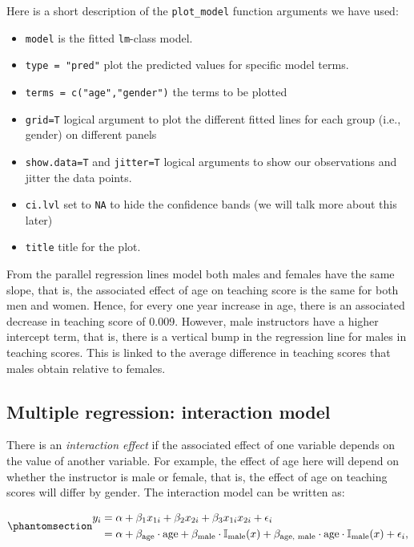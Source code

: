 \documentclass[
  letterpaper,
  DIV=11,
  numbers=noendperiod]{scrartcl}
\begin{document}
Here is a short description of the \texttt{plot\_model} function
arguments we have used:

\begin{itemize}
\item
  \texttt{model} is the fitted \texttt{lm}-class model.
\item
  \texttt{type\ =\ "pred"} plot the predicted values for specific model
  terms.
\item
  \texttt{terms\ =\ c("age","gender")} the terms to be plotted
\item
  \texttt{grid=T} logical argument to plot the different fitted lines
  for each group (i.e., gender) on different panels
\item
  \texttt{show.data=T} and \texttt{jitter=T} logical arguments to show
  our observations and jitter the data points.
\item
  \texttt{ci.lvl} set to \texttt{NA} to hide the confidence bands (we
  will talk more about this later)
\item
  \texttt{title} title for the plot.
\end{itemize}

From the parallel regression lines model both males and females have the
same slope, that is, the associated effect of age on teaching score is
the same for both men and women. Hence, for every one year increase in
age, there is an associated decrease in teaching score of 0.009.
However, male instructors have a higher intercept term, that is, there
is a vertical bump in the regression line for males in teaching scores.
This is linked to the average difference in teaching scores that males
obtain relative to females.

\subsection{Multiple regression: interaction
model}\label{multiple-regression-interaction-model}

There is an \emph{interaction effect} if the associated effect of one
variable depends on the value of another variable. For example, the
effect of age here will depend on whether the instructor is male or
female, that is, the effect of age on teaching scores will differ by
gender. The interaction model can be written as:

\begin{equation}\phantomsection\label{eq-inter.lm}{
\begin{aligned}
y_{i} &= \alpha + \beta_1  x_{1i} + \beta_2  x_{2i} + \beta_3  x_{1i}  x_{2i} + \epsilon_i \nonumber \\&= \alpha + \beta_{\text{age}} \cdot \text{age} + \beta_{\text{male}} \cdot \mathbb{I}_{\text{male}}(x) + \beta_{\text{age, male}} \cdot \text{age} \cdot \mathbb{I}_{\text{male}}(x) + \epsilon_i, 
\end{aligned}
}\end{equation}
\end{document}
